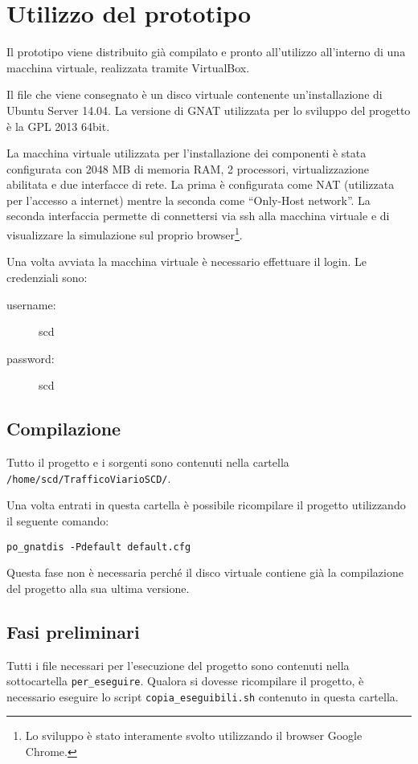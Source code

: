 \section{Utilizzo del prototipo}
Il prototipo viene distribuito già compilato e pronto all'utilizzo all'interno
di una macchina virtuale, realizzata tramite VirtualBox.

Il file che viene consegnato è un disco virtuale contenente un'installazione di
Ubuntu Server 14.04. La versione di GNAT utilizzata per lo sviluppo del progetto
è la GPL 2013 64bit.

La macchina virtuale utilizzata per l'installazione dei componenti è stata
configurata con 2048 MB di memoria RAM, 2 processori, virtualizzazione abilitata
e due interfacce di rete. La prima è configurata come NAT (utilizzata per
l'accesso a internet) mentre la seconda come ``Only-Host network''. La seconda
interfaccia permette di connettersi via ssh alla macchina virtuale e di
visualizzare la simulazione sul proprio browser\footnote{Lo sviluppo è stato
interamente svolto utilizzando il browser Google Chrome.}. 

Una volta avviata la macchina virtuale è necessario effettuare il login. Le
credenziali sono:
\begin{description}
	\item[username:] scd
	\item[password:] scd
\end{description}

\subsection{Compilazione}
Tutto il progetto e i sorgenti sono contenuti nella cartella
\texttt{/home/scd/TrafficoViarioSCD/}.

Una volta entrati in questa cartella è possibile ricompilare il progetto
utilizzando il seguente comando:

\begin{center}
\texttt{po\_gnatdis -Pdefault default.cfg}
\end{center}

Questa fase non è necessaria perché il disco virtuale contiene già la
compilazione del progetto alla sua ultima versione.

\subsection{Fasi preliminari}
Tutti i file necessari per l'esecuzione del progetto sono contenuti nella
sottocartella \texttt{per\_eseguire}. Qualora si dovesse ricompilare il
progetto, è necessario eseguire lo script \texttt{copia\_eseguibili.sh} contenuto in
questa cartella.

